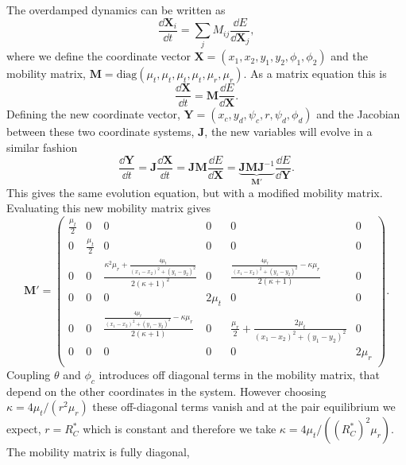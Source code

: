 The overdamped dynamics can be written as
\begin{equation}
    \frac{\dd \mathbf{X}_i}{\dd t}= \sum_{j}M_{ij}\frac{\dd E}{\dd \mathbf{X}_j},
\end{equation}
where we define the coordinate vector $\mathbf{X}=(x_1, x_2, y_1, y_2, \phi_1, \phi_2)$ and the mobility matrix, $\mathbf{M}=\mathrm{diag}(\mu_t, \mu_t, \mu_t, \mu_t,\mu_r, \mu_r)$. As a matrix equation this is
\begin{equation}
    \frac{\dd \mathbf{X}}{\dd t}= \mathbf{M}\frac{\dd E}{\dd \mathbf{X}}.
\end{equation}
Defining the new coordinate vector, $\mathbf{Y}=(x_c, y_d, \psi_c, r, \psi_d, \phi_d)$ and the Jacobian between these two coordinate systems, $\mathbf{J}$, the new variables will evolve in a similar fashion
\begin{equation}
    \frac{\dd \mathbf{Y}}{\dd t} = \mathbf{J}\frac{\dd \mathbf{X}}{\dd t} = \mathbf{J}\mathbf{M}\frac{\dd E}{\dd \mathbf{X}} = \underbrace{\mathbf{J}\mathbf{M}\mathbf{J}^{-1}}_{\mathbf{M'}}\frac{\dd E}{\dd \mathbf{Y}}.
\end{equation}
This gives the same evolution equation, but with a modified mobility matrix. Evaluating this new mobility matrix gives
\begin{equation}
    \mathbf{M}'=
\left(
\begin{array}{cccccc}
 \frac{\mu_t}{2} & 0 & 0 & 0 & 0 & 0 \\
 0 & \frac{\mu_t}{2} & 0 & 0 & 0 & 0 \\
 0 & 0 & \frac{\kappa ^2 \mu_r+\frac{4 \mu_t}{(x_{1}-x_{2})^2+(y_{1}-y_{2})^2}}{2 (\kappa +1)^2} & 0 & \frac{\frac{4 \mu_t}{(x_{1}-x_{2})^2+(y_{1}-y_{2})^2}-\kappa  \mu_r}{2 (\kappa +1)} & 0 \\
 0 & 0 & 0 & 2 \mu_t & 0 & 0 \\
 0 & 0 & \frac{\frac{4 \mu_t}{(x_{1}-x_{2})^2+(y_{1}-y_{2})^2}-\kappa  \mu_r}{2 (\kappa +1)} & 0 & \frac{\mu_r}{2}+\frac{2 \mu_t}{(x_{1}-x_{2})^2+(y_{1}-y_{2})^2} & 0 \\
 0 & 0 & 0 & 0 & 0 & 2 \mu_r \\
\end{array}
\right).
\end{equation}
Coupling $\theta$ and $\phi_c$ introduces off diagonal terms in the mobility matrix, that depend on the other coordinates in the system. However choosing $\kappa = 4\mu_t/(r^2\mu_r)$ these off-diagonal terms vanish and at the pair equilibrium we expect, $r=R_C^*$ which is constant and therefore we take $\kappa = 4\mu_t/((R_C^*)^2\mu_r)$.  The mobility matrix is fully diagonal,

